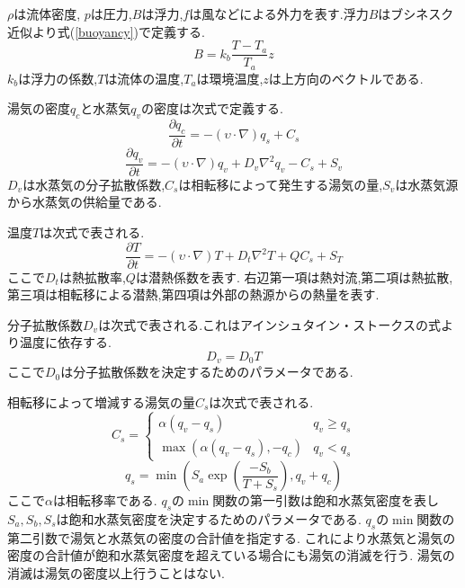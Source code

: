 $\rho$は流体密度,	$p$は圧力,$B$は浮力,$f$は風などによる外力を表す.浮力$B$はブシネスク近似より式(\ref{buoyancy})で定義する.
\begin{equation}
\label{buoyancy}
B=k_{b}\frac{T-T_{a}}{T_{a}}z
\end{equation}
$k_{b}$は浮力の係数,$T$は流体の温度,$T_{a}$は環境温度,$z$は上方向のベクトルである.

湯気の密度$q_{c}$と水蒸気$q_{v}$の密度は次式で定義する.
\begin{equation}
\label{steam}
\frac{\partial q_{c}}{\partial t} = -(\upsilon \cdot \nabla)q_{s} + C_{s}
\end{equation}
\begin{equation}
\label{vapor}
\frac{\partial q_{v}}{\partial t} = -(\upsilon \cdot \nabla)q_{v} + D_{v}\nabla^2q_{v} - C_{s} + S_{v}
\end{equation}
$D_{v}$は水蒸気の分子拡散係数,$C_{s}$は相転移によって発生する湯気の量,$S_{v}$は水蒸気源から水蒸気の供給量である.

温度$T$は次式で表される.
\begin{equation}
\label{temperature}
\frac{\partial T}{\partial t} = - (\upsilon \cdot \nabla)T + D_{t}\nabla^2T +  QC_{s} + S_{T}
\end{equation}
ここで$D_{t}$は熱拡散率,$Q$は潜熱係数を表す.
右辺第一項は熱対流,第二項は熱拡散,第三項は相転移による潜熱,第四項は外部の熱源からの熱量を表す.

分子拡散係数$D_{v}$は次式で表される.これはアインシュタイン・ストークスの式より温度に依存する.
\begin{equation}
\label{diffusion}
D_{v}=D_{0}T
\end{equation}
ここで$D_{0}$は分子拡散係数を決定するためのパラメータである.

相転移によって増減する湯気の量$C_{s}$は次式で表される.
\begin{equation}
\label{transition} 
C_{s} =
\begin{cases}
 \alpha(q_{v}-q_{s}) & q_{v} \geq q_{s}\\
 \max\left(\alpha(q_{v}-q_{s}),-q_{c}\right) & q_{v} < q_{s}
\end{cases}
\end{equation}
\begin{equation}
\label{saturation}
q_{s} = \min\left(S_{a} \exp\left(\frac{-S_{b}}{T+S_{s}}\right),q_{v}+q_{c}\right)
\end{equation}
ここで$\alpha$は相転移率である.
$q_{s}$の$\min$関数の第一引数は飽和水蒸気密度を表し
$S_{a},S_{b},S_{s}$は飽和水蒸気密度を決定するためのパラメータである.
$q_{s}$の$\min$関数の第二引数で湯気と水蒸気の密度の合計値を指定する.
これにより水蒸気と湯気の密度の合計値が飽和水蒸気密度を超えている場合にも湯気の消滅を行う.
湯気の消滅は湯気の密度以上行うことはない.


